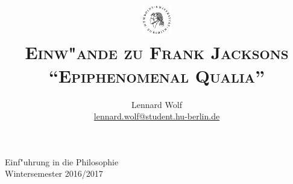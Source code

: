 \documentclass[a4paper, emulatestandardclasses, 12pt]{scrartcl}
\date{\vspace{-3ex}}
\begin{document}
\title{%
	\includegraphics*[width=0.1\textwidth]{images/hu_logo2.png}\\
	\vspace{50pt}
	\scshape\LARGE{Einw"ande zu Frank Jacksons "`Epiphenomenal Qualia"'}}
	
\author{Lennard Wolf\\
        \small{\href{mailto:lennard.wolf@student.hu-berlin.de}{lennard.wolf@student.hu-berlin.de}}}      

\maketitle

\vspace{\fill}

\begin{minipage}[b]{\textwidth}
    \centering
    \onehalfspacing
    \large   
    Einf"uhrung in die Philosophie\\
    Wintersemester 2016/2017

    \vspace{-20mm} 
\end{minipage}%
\thispagestyle{empty}
\newpage
\clearpage
\setcounter{page}{1}
\end{document}
